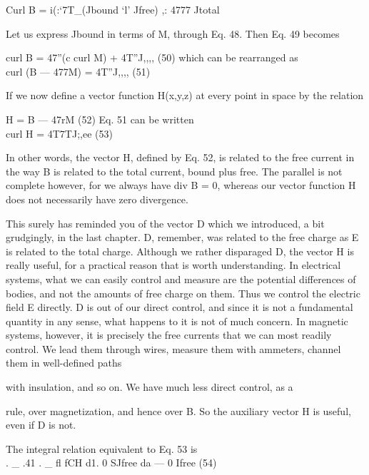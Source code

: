 {Curl B = i(:‘7T_(Jbound ‘l' Jfree) ,: 4777 Jtotal 

Let us express Jbound in terms of M, through Eq. 48. Then Eq. 49
becomes
\begin{equation}
\end{equation}

curl B = 47''(c curl M) + 4T''J,,,, (50)
which can be rearranged as
\begin{equation}
\end{equation}
curl (B  ---  477M) = 4T''J,,,, (51)

If we now define a vector function H(x,y,z) at every point in space
by the relation
\begin{equation}
\end{equation}

H = B  ---  47rM (52)
Eq. 51 can be written
\begin{equation}
\end{equation}
curl H = 4T7TJ;,ee (53)

In other words, the vector H, defined by Eq. 52, is related to the
free current in the way B is related to the total current, bound plus
free. The parallel is not complete however, for we always have
div B = 0, whereas our vector function H does not necessarily have
zero divergence.

This surely has reminded you of the vector D which we introduced,
a bit grudgingly, in the last chapter. D, remember, was related to
the free charge as E is related to the total charge. Although we rather
disparaged D, the vector H is really useful, for a practical reason that
is worth understanding. In electrical systems, what we can easily
control and measure are the potential differences of bodies, and not
the amounts of free charge on them. Thus we control the electric
field E directly. D is out of our direct control, and since it is not a
fundamental quantity in any sense, what happens to it is not of much
concern. In magnetic systems, however, it is precisely the free currents
that we can most readily control. We lead them through wires,
measure them with ammeters, channel them in well-defined paths

with insulation, and so on. We have much less direct control, as a

rule, over magnetization, and hence over B. So the auxiliary vector
H is useful, even if D is not.

The integral relation equivalent to Eq. 53 is
\begin{equation}
\end{equation}
. _ .41 . _ fl
fCH d1. 0 SJfree da ---  0 Ifree (54)

}
